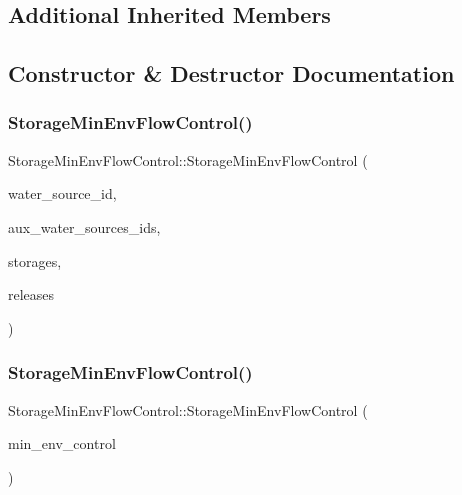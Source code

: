 \subsection*{Additional Inherited Members}


\subsection{Constructor \& Destructor Documentation}
\mbox{\label{classStorageMinEnvFlowControl_aba965c28890bf5abb1230dd6d8879f18}} 
\subsubsection{\texorpdfstring{Storage\+Min\+Env\+Flow\+Control()}{StorageMinEnvFlowControl()}\hspace{0.1cm}{\footnotesize\ttfamily [1/2]}}
{\footnotesize\ttfamily Storage\+Min\+Env\+Flow\+Control\+::\+Storage\+Min\+Env\+Flow\+Control (\begin{DoxyParamCaption}\item[{int}]{water\+\_\+source\+\_\+id,  }\item[{const vector$<$ int $>$ \&}]{aux\+\_\+water\+\_\+sources\+\_\+ids,  }\item[{vector$<$ double $>$ \&}]{storages,  }\item[{vector$<$ double $>$ \&}]{releases }\end{DoxyParamCaption})}

\mbox{\label{classStorageMinEnvFlowControl_a2279f6d44b8ba69830a29654ddee8d3a}} 
\subsubsection{\texorpdfstring{Storage\+Min\+Env\+Flow\+Control()}{StorageMinEnvFlowControl()}\hspace{0.1cm}{\footnotesize\ttfamily [2/2]}}
{\footnotesize\ttfamily Storage\+Min\+Env\+Flow\+Control\+::\+Storage\+Min\+Env\+Flow\+Control (\begin{DoxyParamCaption}\item[{const \mbox{\hyperlink{classStorageMinEnvFlowControl}{Storage\+Min\+Env\+Flow\+Control}} \&}]{min\+\_\+env\+\_\+control }\end{DoxyParamCaption})}



